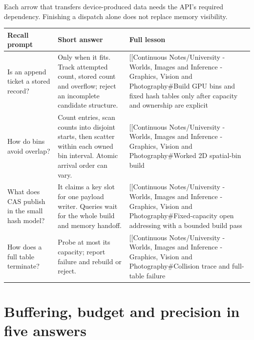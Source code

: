 Each arrow that transfers device-produced data needs the API's required dependency. Finishing a dispatch alone does not replace memory visibility.

{\def\LTcaptype{none} %
\begin{longtable}[]{@{}
  >{\raggedright\arraybackslash}p{}
  >{\raggedright\arraybackslash}p{}
  >{\raggedright\arraybackslash}p{}@{}}
\toprule\noalign{}
\begin{minipage}[b]{\linewidth}\raggedright
Recall prompt
\end{minipage} & \begin{minipage}[b]{\linewidth}\raggedright
Short answer
\end{minipage} & \begin{minipage}[b]{\linewidth}\raggedright
Full lesson
\end{minipage} \\
\midrule\noalign{}
\endhead
\bottomrule\noalign{}
\endlastfoot
Is an append ticket a stored record? & Only when it fits. Track attempted count, stored count and overflow; reject an incomplete candidate structure. & {[}{[}Continuous Notes/University - Worlds, Images and Inference - Graphics, Vision and Photography\#Build GPU bins and fixed hash tables only after capacity and ownership are explicit \\
How do bins avoid overlap? & Count entries, scan counts into disjoint starts, then scatter within each owned bin interval. Atomic arrival order can vary. & {[}{[}Continuous Notes/University - Worlds, Images and Inference - Graphics, Vision and Photography\#Worked 2D spatial-bin build \\
What does CAS publish in the small hash model? & It claims a key slot for one payload writer. Queries wait for the whole build and memory handoff. & {[}{[}Continuous Notes/University - Worlds, Images and Inference - Graphics, Vision and Photography\#Fixed-capacity open addressing with a bounded build pass \\
How does a full table terminate? & Probe at most its capacity; report failure and rebuild or reject. & {[}{[}Continuous Notes/University - Worlds, Images and Inference - Graphics, Vision and Photography\#Collision trace and full-table failure \\
\end{longtable}
}

\section{Buffering, budget and precision in five answers}\label{appendix-a8f634b076b5-buffering-budget-and-precision-in-five-answers}

